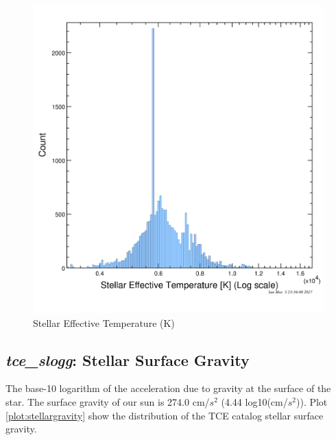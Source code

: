 \begin{figure}[!h]
\begin{center}
        \includegraphics[width=0.5\textheight]{img/stellartemp.png}
        \caption{Stellar Effective Temperature (K)}  \label{plot:stellartemp}
\end{center}
\end{figure}

\subsection{\emph{tce\_slogg}: Stellar Surface Gravity}
The base-10 logarithm of the acceleration due to gravity at the surface of the star. The surface gravity of our sun is 274.0 cm/$s^{2}$ (4.44 log10(cm/$s^{2}$)). Plot \ref{plot:stellargravity} show the distribution of the TCE catalog stellar surface gravity. 

